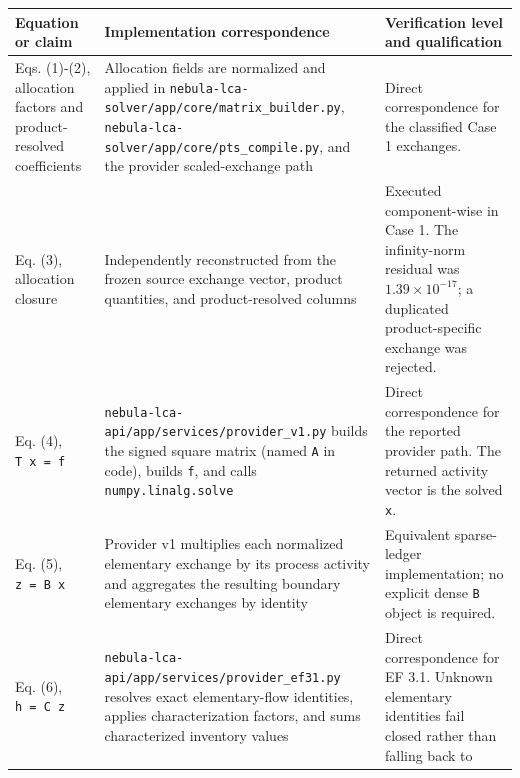 \documentclass[
  10pt,
  a4paper,
  DIV=11,
  numbers=noendperiod]{scrartcl}
\newcounter{none} %
\begin{document}
{\def\LTcaptype{none} %
\begin{longtable}[]{@{}
  >{\raggedright\arraybackslash}p{}
  >{\raggedright\arraybackslash}p{}
  >{\raggedright\arraybackslash}p{}@{}}
\toprule\noalign{}
\begin{minipage}[b]{\linewidth}\raggedright
Equation or claim
\end{minipage} & \begin{minipage}[b]{\linewidth}\raggedright
Implementation correspondence
\end{minipage} & \begin{minipage}[b]{\linewidth}\raggedright
Verification level and qualification
\end{minipage} \\
\midrule\noalign{}
\endhead
\bottomrule\noalign{}
\endlastfoot
Eqs. (1)-(2), allocation factors and product-resolved coefficients &
Allocation fields are normalized and applied in
\texttt{nebula-lca-solver/app/core/matrix\_builder.py},
\texttt{nebula-lca-solver/app/core/pts\_compile.py}, and the provider
scaled-exchange path & Direct correspondence for the classified Case 1
exchanges. \\
Eq. (3), allocation closure & Independently reconstructed from the
frozen source exchange vector, product quantities, and product-resolved
columns & Executed component-wise in Case 1. The infinity-norm residual
was \(1.39\times10^{-17}\); a duplicated product-specific exchange was
rejected. \\
Eq. (4), \texttt{T\ x\ =\ f} &
\texttt{nebula-lca-api/app/services/provider\_v1.py} builds the signed
square matrix (named \texttt{A} in code), builds \texttt{f}, and calls
\texttt{numpy.linalg.solve} & Direct correspondence for the reported
provider path. The returned activity vector is the solved \texttt{x}. \\
Eq. (5), \texttt{z\ =\ B\ x} & Provider v1 multiplies each normalized
elementary exchange by its process activity and aggregates the resulting
boundary elementary exchanges by identity & Equivalent sparse-ledger
implementation; no explicit dense \texttt{B} object is required. \\
Eq. (6), \texttt{h\ =\ C\ z} &
\texttt{nebula-lca-api/app/services/provider\_ef31.py} resolves exact
elementary-flow identities, applies characterization factors, and sums
characterized inventory values & Direct correspondence for EF 3.1.
Unknown elementary identities fail closed rather than falling back to

\end{longtable}}
\end{document}
